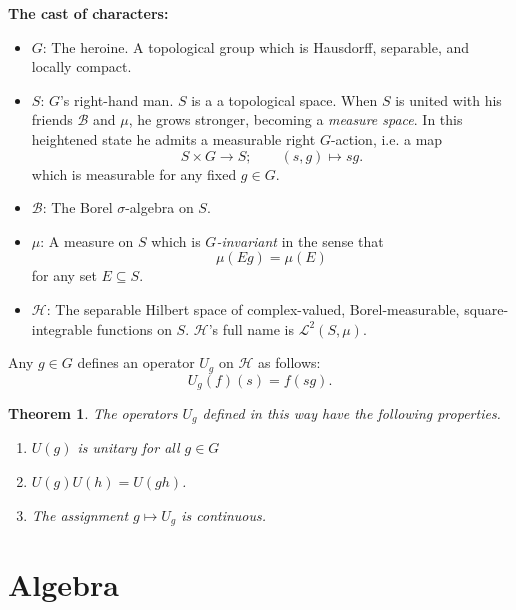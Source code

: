 \documentclass[a4paper,10pt]{scrreprt}
\theoremstyle{definition}
\theoremstyle{plain}
\newtheorem{theorem}{Theorem}[section]
\theoremstyle{remark}
\begin{document}
\textbf{The cast of characters:}
\begin{itemize}
  \item $G$: The heroine. A topological group which is Hausdorff, separable, and locally compact.

  \item $S$: $G$'s right-hand man. $S$ is a a topological space. When $S$ is united with his friends $\mathcal{B}$ and $\mu$, he grows stronger, becoming a \emph{measure space}. In this heightened state he admits a measurable right $G$-action, i.e. a map 
    \begin{equation*}
      S \times G \to S;\qquad (s, g) \mapsto sg.
    \end{equation*}
    which is measurable for any fixed $g \in G$.
    

  \item $\mathcal{B}$: The Borel $\sigma$-algebra on $S$.

  \item $\mu$: A measure on $S$ which is \emph{$G$-invariant} in the sense that 
    \begin{equation*}
      \mu(Eg) = \mu(E)
    \end{equation*}
    for any set $E \subseteq S$.

  \item $\mathscr{H}$: The separable Hilbert space of complex-valued, Borel-measurable, square-integrable functions on $S$. $\mathscr{H}$'s full name is $\mathscr{L}^{2}(S, \mu)$.
\end{itemize}

Any $g \in G$ defines an operator $U_{g}$ on $\mathscr{H}$ as follows:
\begin{equation*}
  U_{g}(f)(s) = f(sg).
\end{equation*}

\begin{theorem}
  The operators $U_{g}$ defined in this way have the following properties.
  \begin{enumerate}
    \item $U(g)$ is unitary for all $g \in G$

    \item $U(g) U(h) = U(gh)$.

    \item The assignment $g \mapsto U_{g}$ is continuous.
  \end{enumerate}
\end{theorem}

\chapter{Algebra}
\end{document}
